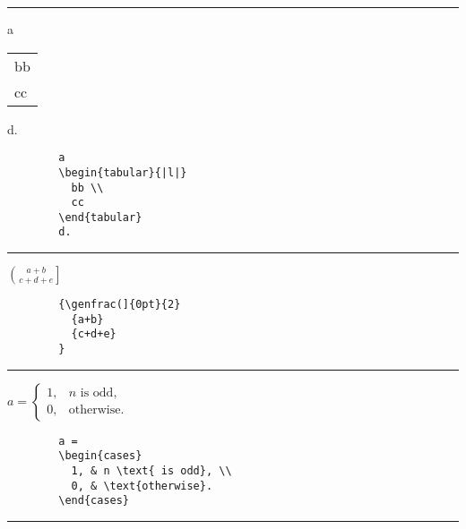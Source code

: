 \documentclass[a4paper,10pt,landscape]{article}
\newcommand{\hSep}{{\color{colorSep}\hrule}}
\theoremstyle{definition}
\theoremstyle{remark}
\begin{document}
\begin{multicols}{3}

\hSep
\begin{multicols}{2}
		a
		\begin{tabular}{|l|}
		  bb \\
		  cc
		\end{tabular}
		d.
\columnbreak
	\begin{verbatim}
		a
		\begin{tabular}{|l|}
		  bb \\
		  cc
		\end{tabular}
		d.
	\end{verbatim}
\end{multicols}
\hSep
\begin{multicols}{2}
	 $
		{\genfrac(]{0pt}{2}
		  {a+b}
		  {c+d+e}
		}
	 $
\columnbreak
	\begin{verbatim}
		{\genfrac(]{0pt}{2}
		  {a+b}
		  {c+d+e}
		}
	\end{verbatim}
\end{multicols}
\hSep
\begin{multicols}{2}
	$
		a = 
		\begin{cases}
		  1, & n \text{ is odd}, \\
		  0, & \text{otherwise}.
		\end{cases}
	$
\columnbreak
	\begin{verbatim}
		a = 
		\begin{cases}
		  1, & n \text{ is odd}, \\
		  0, & \text{otherwise}.
		\end{cases}
	\end{verbatim}
\end{multicols}
\hSep
\begin{multicols}{2}

\end{multicols}
\end{multicols}
\end{document}
